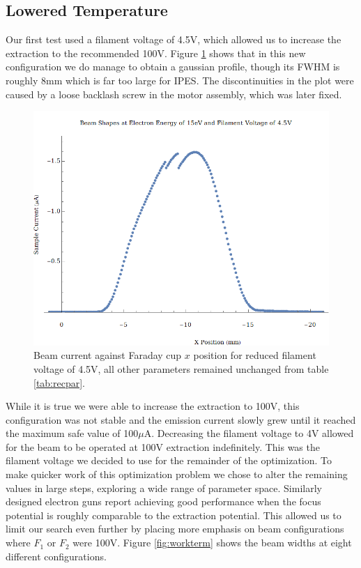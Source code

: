 \subsection{Lowered Temperature}

Our first test used a filament voltage of 4.5V, which allowed us to increase the extraction to the recommended 100V. 
Figure \ref{fig:firstgauss} shows that in this new configuration we do manage to obtain a gaussian profile, 
though its FWHM is roughly 8mm which is far too large for IPES. The discontinuities in the plot were caused by a loose backlash screw in the 
motor assembly, which was later fixed.

\begin{figure}[h!]
    \centering
    \includegraphics[width=0.85\linewidth]{../Work Term Replication/Plots/Work Term Replication E15Fil4.5.png}
	\caption{Beam current against Faraday cup $x$ position for reduced filament voltage of 4.5V, all other parameters remained unchanged from 
	table \ref{tab:recpar}.}
    \label{fig:firstgauss}
\end{figure}

While it is true we were able to increase the extraction to 100V, this configuration was not stable and the emission current slowly grew until it 
reached the maximum safe value of 100$\mu$A. Decreasing the filament voltage to 4V allowed for the beam to be operated at 100V extraction indefinitely. This was 
the filament voltage we decided to use for the remainder of the optimization. To make quicker work of this optimization problem we chose to alter the 
remaining values in large steps, exploring a wide range of parameter space. Similarly designed electron guns report achieving good performance when
the focus potential is roughly comparable to the extraction potential\cite{stoffel1985low,raj2004optimization}. This allowed us to limit our search even further by placing more emphasis 
on beam configurations where $F_1$ or $F_2$ were 100V. Figure \ref{fig:workterm} shows the beam widths at eight different configurations.

